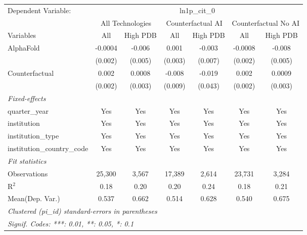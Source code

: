 \begingroup
\centering
\begin{tabular}{lcccccc}
   \tabularnewline \midrule \midrule
   Dependent Variable: & \multicolumn{6}{c}{ln1p\_cit\_0}\\
 & \multicolumn{2}{c}{All Technologies} & \multicolumn{2}{c}{Counterfactual AI} & \multicolumn{2}{c}{Counterfactual No AI} \\
\cmidrule(lr){1-1}\cmidrule(lr){2-3} \cmidrule(lr){4-5} \cmidrule(lr){6-7}
Variables & \multicolumn{1}{c}{All} & \multicolumn{1}{c}{High PDB} & \multicolumn{1}{c}{All} & \multicolumn{1}{c}{High PDB} & \multicolumn{1}{c}{All} & \multicolumn{1}{c}{High PDB} \\
\cmidrule(lr){1-1}\cmidrule(lr){2-2} \cmidrule(lr){3-3} \cmidrule(lr){4-4} \cmidrule(lr){5-5} \cmidrule(lr){6-6} \cmidrule(lr){7-7}
   AlphaFold                    & -0.0004 & -0.006  & 0.001   & -0.003  & -0.0008 & -0.008\\   
                                & (0.002) & (0.005) & (0.003) & (0.007) & (0.002) & (0.005)\\   
   Counterfactual               & 0.002   & 0.0008  & -0.008  & -0.019  & 0.002   & 0.0009\\   
                                & (0.002) & (0.003) & (0.009) & (0.043) & (0.002) & (0.003)\\   
   \midrule
   \emph{Fixed-effects}\\
   quarter\_year                & Yes     & Yes     & Yes     & Yes     & Yes     & Yes\\  
   institution                  & Yes     & Yes     & Yes     & Yes     & Yes     & Yes\\  
   institution\_type            & Yes     & Yes     & Yes     & Yes     & Yes     & Yes\\  
   institution\_country\_code   & Yes     & Yes     & Yes     & Yes     & Yes     & Yes\\  
   \midrule
   \emph{Fit statistics}\\
   Observations                 & 25,300  & 3,567   & 17,389  & 2,614   & 23,731  & 3,284\\  
   R$^2$                        & 0.18    & 0.20    & 0.20    & 0.24    & 0.18    & 0.21\\  
Mean(Dep. Var.) & 0.537 & 0.662 & 0.514 & 0.628 & 0.540 & 0.675 \\
   \midrule \midrule
   \multicolumn{7}{l}{\emph{Clustered (pi\_id) standard-errors in parentheses}}\\
   \multicolumn{7}{l}{\emph{Signif. Codes: ***: 0.01, **: 0.05, *: 0.1}}\\
\end{tabular}
\par\endgroup
